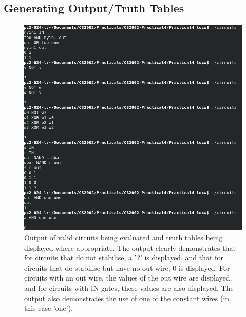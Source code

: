 \documentclass[11]{article}
\begin{document}
			\subsection{Generating Output/Truth Tables}
				\begin{figure}[h!]
					\caption{Output of valid circuits being evaluated and truth tables being displayed where appropriate. The output clearly demonstrates that for circuits that do not stabilise, a '?' is displayed, and that for circuits that do stabilise but have no out wire, 0 is displayed. For circuits with an out wire, the values of the out wire are displayed, and for circuits with IN gates, these values are also displayed. The output also demonstrates the use of one of the constant wires (in this case 'one').}				\centering
					\includegraphics[scale=0.5]{OutputOfValidInput.png}
				\end{figure}
		
	\newpage
\end{document}
